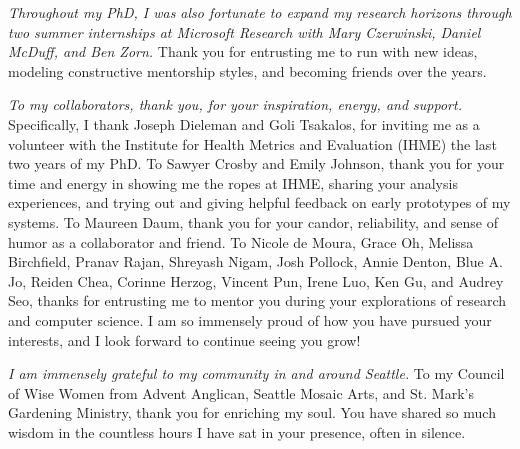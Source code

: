 \textit{Throughout my PhD, I was also fortunate to expand my research horizons
through two summer internships at Microsoft Research with Mary Czerwinski,
Daniel McDuff, and Ben Zorn.} Thank you for entrusting me to run with new ideas,
modeling constructive mentorship styles, and becoming friends over the years.

\textit{To my collaborators, thank you, for your inspiration, energy, and support.}
Specifically, I thank Joseph Dieleman and Goli Tsakalos, for inviting me as
a volunteer with the Institute for Health Metrics and Evaluation (IHME) the
last two years of my PhD. To Sawyer Crosby and Emily Johnson, thank you for
your time and energy in showing me the ropes at IHME, sharing your analysis
experiences, and trying out and giving helpful feedback on early prototypes
of my systems. To Maureen Daum, thank you for your candor, reliability, and
sense of humor as a collaborator and friend. To Nicole de Moura, Grace Oh,
Melissa Birchfield, Pranav Rajan, Shreyash Nigam, Josh Pollock, Annie
Denton, Blue A. Jo, Reiden Chea, Corinne Herzog, Vincent Pun, Irene Luo, Ken
Gu, and Audrey Seo, thanks for entrusting me to mentor you during your
explorations of research and computer science. I am so immensely proud of
how you have pursued your interests, and I look forward to continue seeing
you grow!

\textit{I am immensely grateful to my community in and around Seattle.} To my
Council of Wise Women from Advent Anglican, Seattle Mosaic Arts, and St. Mark's
Gardening Ministry, thank you for enriching my soul. You have shared so much
wisdom in the countless hours I have sat in your presence, often in silence.


